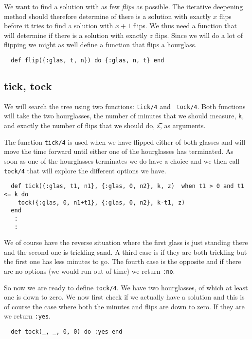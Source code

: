 \documentclass[a4paper,11pt]{article}
\begin{document}
We want to find a solution with as few {\em flips} as
possible. The iterative deepening method should therefore determine of
there is a solution with exactly $x$ flips before it tries to find a
solution with $x+1$ flips. We thus need a function that will determine
if there is a solution with exactly $z$ flips. Since we will do a lot
of flipping we might as well define a function that flips a hourglass.

\begin{verbatim}
  def flip({:glas, t, n}) do {:glas, n, t} end  
\end{verbatim}

\subsection*{tick, tock}

We will search the tree using two functions: {\tt tick/4} and {\tt
  tock/4}. Both functions will take the two hourglasses, the number of
minutes that we should measure, {\tt k}, and exactly the number of
flips that we should do, {\t z}, as arguments.

The function {\tt tick/4} is used when we have flipped either of both
glasses and will move the time forward until either one of the
hourglasses has terminated.  As soon as one of the hourglasses
terminates we do have a choice and we then call {\tt tock/4} that will
explore the different options we have.

\begin{verbatim}
  def tick({:glas, t1, n1}, {:glas, 0, n2}, k, z)  when t1 > 0 and t1 <= k do  
    tock({:glas, 0, n1+t1}, {:glas, 0, n2}, k-t1, z)
  end
   :
   :
\end{verbatim}

We of course have the reverse situation where the first glass is just
standing there and the second one is trickling sand. A third case is
if they are both trickling but the first one has less minutes to
go. The fourth case is the opposite and if there are no options (we would
run out of time) we return {\tt :no}.

So now we are ready to define {\tt tock/4}. We have two hourglasses, of
which at least one is down to zero. We now first check if we actually
have a solution and this is of course the case where both the minutes
and flips are down to zero. If they are we return {\tt :yes}.

\begin{verbatim}
  def tock(_, _, 0, 0) do :yes end
\end{verbatim}
\end{document}
